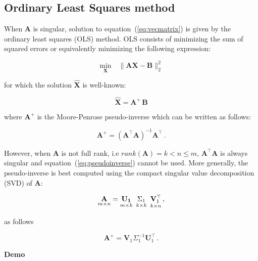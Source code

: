 \subsection{Ordinary Least Squares method}

When $\mathbf{A}$ is singular, solution to equation~(\ref{eq:vecmatrix}) is given
by the ordinary least squares (OLS) method. OLS consists of minimizing the sum
of squared errors or equivalently minimizing the following expression:

\begin{equation}
\label{eq:regressionproblem}
\underset{\mathbf{X}}{\text{min}} \quad \| \mathbf{A}\mathbf{\mathbf{X}} - \mathbf{B} \|_2^2
\end{equation}

\noindent for which the solution $\hat{\mathbf{X}}$ is well-known:

\begin{equation}
\label{eq:MP}
\hat{\mathbf{X}}=\mathbf{A}^{\!\!+}\,\mathbf{B}
\end{equation}

\noindent where $\mathbf{A}^{\!\!+}$ is the Moore-Penrose pseudo-inverse
which can be written as follows: 

\begin{equation}
\label{eq:pseudoinverse}
\mathbf{A}^{\!\!+}= (\mathbf{A}^{\!\!\top} \mathbf{A})^{-1}\mathbf{A}^{\!\!\top} \, .
\end{equation}

However, when $\mathbf{A}$ is not full rank, i.e
$rank(\mathbf{A})=k <  n \leq m$, $\mathbf{A}^\top \mathbf{A}$ is
always singular and equation~(\ref{eq:pseudoinverse}) cannot be used.
More generally, the pseudo-inverse is best computed using the compact
singular value decomposition (SVD) of $\mathbf{A}$:

\begin{equation}
    \label{eq:compactsvd}
    \underset{m \times n}{\mathbf{A}}=
    \underset{m \times k}{\mathbf{U_1}} \enskip
    \underset{k \times k}{\Sigma_1} \enskip
    \underset{k \times n}{\mathbf{V}_1^{\top}} \, ,
\end{equation}

\noindent as follows

\begin{equation}
\label{eq:pseudoinversesvd}
\mathbf{A}^{\!\!+} = \mathbf{V}_1 \Sigma_1^{-1} \mathbf{U}_1^\top \, .
\end{equation}

\textbf{Demo}\quad

